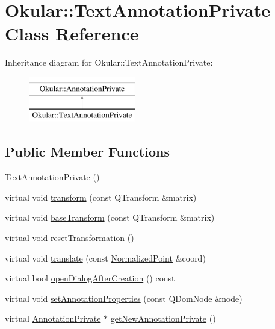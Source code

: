 \hypertarget{classOkular_1_1TextAnnotationPrivate}{\section{Okular\+:\+:Text\+Annotation\+Private Class Reference}
\label{classOkular_1_1TextAnnotationPrivate}
}
Inheritance diagram for Okular\+:\+:Text\+Annotation\+Private\+:\begin{figure}[H]
\begin{center}
\leavevmode
\includegraphics[height=2.000000cm]{classOkular_1_1TextAnnotationPrivate}
\end{center}
\end{figure}
\subsection*{Public Member Functions}
\begin{DoxyCompactItemize}
\item 
\hyperlink{classOkular_1_1TextAnnotationPrivate_a4c8803251fe92ec274a9a418ab7d12bf}{Text\+Annotation\+Private} ()
\item 
virtual void \hyperlink{classOkular_1_1TextAnnotationPrivate_a405c3c633547b45d6b4a2dc4bc4825d1}{transform} (const Q\+Transform \&matrix)
\item 
virtual void \hyperlink{classOkular_1_1TextAnnotationPrivate_a3157ecdd8a6567de2e128ed245a1501b}{base\+Transform} (const Q\+Transform \&matrix)
\item 
virtual void \hyperlink{classOkular_1_1TextAnnotationPrivate_a4fdff70c4c25844c44fb0cd95a298897}{reset\+Transformation} ()
\item 
virtual void \hyperlink{classOkular_1_1TextAnnotationPrivate_a93452f4e1a3f8d6d2aa5f6edee6559aa}{translate} (const \hyperlink{classOkular_1_1NormalizedPoint}{Normalized\+Point} \&coord)
\item 
virtual bool \hyperlink{classOkular_1_1TextAnnotationPrivate_ab47fb182b16f62126481e628d2439cc4}{open\+Dialog\+After\+Creation} () const 
\item 
virtual void \hyperlink{classOkular_1_1TextAnnotationPrivate_a2a468af10ca86287e2ccc0ff32fd8c3a}{set\+Annotation\+Properties} (const Q\+Dom\+Node \&node)
\item 
virtual \hyperlink{classOkular_1_1AnnotationPrivate}{Annotation\+Private} $\ast$ \hyperlink{classOkular_1_1TextAnnotationPrivate_a0b2d0d89540f0f2206ca756ebb36c5c8}{get\+New\+Annotation\+Private} ()
\end{DoxyCompactItemize}
